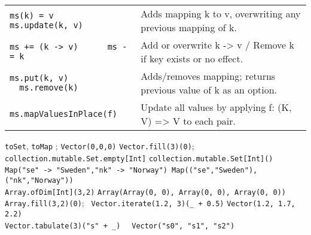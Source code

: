 \documentclass[article, a5paper]{memoir}
\newcommand{\LangColor}{red}
\newcommand{\head}[1]{{\bfseries {\color{\LangColor}{#1}}\par\vspace{1mm}\hrule\vspace{-2mm}}}
\renewcommand{\arraystretch}{0.9}
\newcommand{\code}{\lstinline[basicstyle=\ttfamily]}
\newcommand{\Newline}{\vspace{\baselineskip}}
\newcommand{\Comment}[1]{{\color{commentgreen}{#1}}}
\begin{document}
{\small\renewcommand{\arraystretch}{1.125}
\begin{tabular}{@{}p{5.0cm}  p{6.8cm}}

\texttt{ms(k) = v ~~ ms.update(k, v)} & Adds mapping k to v, overwriting any previous mapping of k.\\   \cline{1-2}

\texttt{ms += (k -> v) ~~~~ ms -= k} & Add or overwrite k -> v / Remove k if key exists or no effect.\\   \cline{1-2}

\texttt{ms.put(k, v) ~~ms.remove(k)}& Adds/removes mapping; returns previous value of k as an option.\\   \cline{1-2}


\texttt{ms.mapValuesInPlace(f)} & Update all values by applying f: (K, V) => V to each pair.\\   \cline{1-2}


\end{tabular}
}

\vspace{0.75em}\head{Factory examples:}\Newline

{\small%
\Comment{On mutable Set, Map:} \code{toSet}, \code{toMap} \Comment{returns immutable};
\hfill\code{Vector(0,0,0)} \Comment{ same as } \code{Vector.fill(3)(0)};
\\
\code{collection.mutable.Set.empty[Int]} \Comment{ same as } \code{collection.mutable.Set[Int]()}\\
\mbox{\code{Map("se" -> "Sweden","nk" -> "Norway")} \Comment{same as }
\code{Map(("se","Sweden"),("nk","Norway"))}}\\
\code{Array.ofDim[Int](3,2)} \Comment{gives} \texttt{Array(Array(0, 0), Array(0, 0), Array(0, 0))} \Comment{same as} \texttt{Array.fill(3,2)(0)};
\texttt{ Vector.iterate(1.2, 3)(\_ + 0.5)} \Comment{gives} \texttt{Vector(1.2, 1.7, 2.2)}\\
\texttt{Vector.tabulate(3)("s" + \_) } \Comment{gives} \code{ Vector("s0", "s1", "s2")}
}




\clearpage
\end{document}
